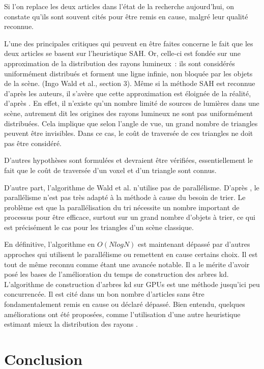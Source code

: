 \documentclass[a4paper]{article}
\begin{document}
Si l'on replace les deux articles dans l'état de la recherche aujourd'hui, on constate qu'ils sont souvent cités pour être remis en cause, malgré leur qualité reconnue. 

L'une des principales critiques qui peuvent en être faites concerne le fait que les deux articles se basent sur l'heuristique SAH. Or, celle-ci est fondée sur une approximation de la distribution des rayons lumineux~: ils sont considérés uniformément distribués et forment une ligne infinie, non bloquée par les objets de la scène. (Ingo Wald et al., section 3). Même si la méthode SAH est reconnue d'après les auteurs, il s'avère que cette approximation est éloignée de la réalité, d'après \cite{anti-sah}. En effet, il n'existe qu'un nombre limité de sources de lumières dans une scène, autrement dit les origines des rayons lumineux ne sont pas uniformément distribuées. Cela implique que selon l'angle de vue, un grand nombre de triangles peuvent être invisibles. Dans ce cas, le coût de traversée de ces triangles ne doit pas être considéré.

D'autres hypothèses sont formulées et devraient être vérifiées, essentiellement le fait que le coût de traversée d'un voxel et d'un triangle sont connus.

D'autre part, l'algorithme de Wald et al. n'utilise pas de parallélisme. D'après \cite{parallel-cpu}, le parallélisme n'est pas très adapté à la méthode à cause du besoin de trier. Le problème est que la parallélisation du tri nécessite un nombre important de processus pour être efficace, surtout sur un grand nombre d'objets à trier, ce qui est précisément le cas pour les triangles d'un scène classique.

En définitive, l'algorithme en $O(NlogN)$ est maintenant dépassé par d'autres approches qui utilisent le parallélisme ou remettent en cause certains choix. Il est tout de même reconnu comme étant une avancée notable. Il a le mérite d'avoir posé les bases de l'amélioration du temps de construction des arbres kd.
L'algorithme de construction d'arbres kd sur GPUs est une méthode jusqu'ici peu concurrencée. Il est cité dans un bon nombre d'articles sans être fondamentalement remis en cause ou déclaré dépassé. Bien entendu, quelques améliorations ont été proposées, comme l'utilisation d'une autre heuristique estimant mieux la distribution des rayons \cite{anti-sah}.

\section{Conclusion}
\end{document}
